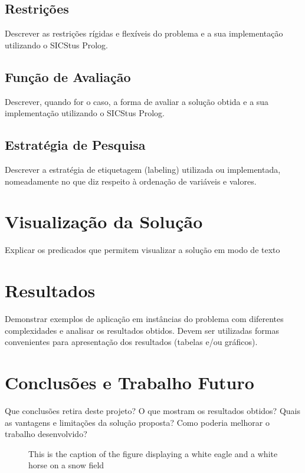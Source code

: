 \documentclass{llncs}
\begin{document}
\subsection{Restrições}
 Descrever as restrições rígidas e flexíveis do problema e a sua implementação utilizando o SICStus Prolog.

\subsection{ Função de Avaliação}
Descrever, quando for o caso, a forma de avaliar a solução obtida e a sua implementação utilizando o SICStus Prolog.

\subsection{Estratégia de Pesquisa}
Descrever a estratégia de etiquetagem
(labeling) utilizada ou implementada, nomeadamente no que diz respeito à ordenação
de variáveis e valores.

\section{Visualização da Solução}
Explicar os predicados que permitem visualizar a solução em modo de texto

\section{Resultados}
Demonstrar exemplos de aplicação em instâncias do problema com
diferentes complexidades e analisar os resultados obtidos. Devem ser utilizadas formas
convenientes para apresentação dos resultados (tabelas e/ou gráficos).

\section{Conclusões e Trabalho Futuro}
 Que conclusões retira deste projeto? O que mostram os resultados obtidos? Quais as vantagens e limitações da
solução proposta? Como poderia melhorar o trabalho desenvolvido?

\begin{figure}
\vspace{2.5cm}
\caption{This is the caption of the figure displaying a white eagle and
a white horse on a snow field}
\end{figure}
\end{document}
